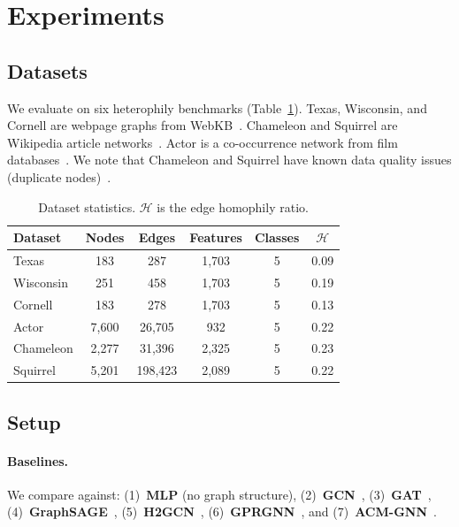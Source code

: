 \documentclass[runningheads]{llncs}
\begin{document}
\section{Experiments}\label{sec:experiments}

\subsection{Datasets}

We evaluate on six heterophily benchmarks (Table~\ref{tab:datasets}).
Texas, Wisconsin, and Cornell are webpage graphs from WebKB~\cite{pei2020geom}.
Chameleon and Squirrel are Wikipedia article networks~\cite{pei2020geom}.
Actor is a co-occurrence network from film databases~\cite{pei2020geom}.
We note that Chameleon and Squirrel have known data quality issues (duplicate nodes)~\cite{platonov2023critical}.

\begin{table}[t]
\caption{Dataset statistics. $\mathcal{H}$ is the edge homophily ratio.}\label{tab:datasets}
\centering
\begin{tabular}{lccccc}
\toprule
Dataset & Nodes & Edges & Features & Classes & $\mathcal{H}$ \\
\midrule
Texas & 183 & 287 & 1,703 & 5 & 0.09 \\
Wisconsin & 251 & 458 & 1,703 & 5 & 0.19 \\
Cornell & 183 & 278 & 1,703 & 5 & 0.13 \\
Actor & 7,600 & 26,705 & 932 & 5 & 0.22 \\
Chameleon & 2,277 & 31,396 & 2,325 & 5 & 0.23 \\
Squirrel & 5,201 & 198,423 & 2,089 & 5 & 0.22 \\
\bottomrule
\end{tabular}
\end{table}

\subsection{Setup}

\paragraph{Baselines.}
We compare against: (1)~\textbf{MLP} (no graph structure), (2)~\textbf{GCN}~\cite{kipf2017semi}, (3)~\textbf{GAT}~\cite{velickovic2018graph}, (4)~\textbf{GraphSAGE}~\cite{hamilton2017inductive}, (5)~\textbf{H2GCN}~\cite{zhu2020beyond}, (6)~\textbf{GPRGNN}~\cite{chien2021adaptive}, and (7)~\textbf{ACM-GNN}~\cite{luan2022revisiting}.
\end{document}
